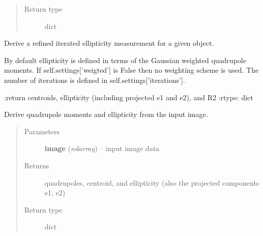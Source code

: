 \documentclass[a4paper,12pt,english]{sphinxmanual}
\begin{document}
\begin{fulllineitems}
\begin{fulllineitems}
\begin{quote}
\begin{description}
\item[{Return type}] \leavevmode
dict

\end{description}\end{quote}

\end{fulllineitems}


\begin{fulllineitems}
\label{analysis:analysis.shape.shapeMeasurement.measureRefinedEllipticity}
Derive a refined iterated ellipticity measurement for a given object.

By default ellipticity is defined in terms of the Gaussian weighted quadrupole moments.
If self.settings{[}'weigted'{]} is False then no weighting scheme is used.
The number of iterations is defined in self.settings{[}'iterations'{]}.

:return centroids, ellipticity (including projected e1 and e2), and R2
:rtype: dict

\end{fulllineitems}


\begin{fulllineitems}
\label{analysis:analysis.shape.shapeMeasurement.quadrupoles}
Derive quadrupole moments and ellipticity from the input image.
\begin{quote}\begin{description}
\item[{Parameters}] \leavevmode
\textbf{image} (\emph{ndarray}) -- input image data

\item[{Returns}] \leavevmode
quadrupoles, centroid, and ellipticity (also the projected components e1, e2)

\item[{Return type}] \leavevmode
dict

\end{description}\end{quote}

\end{fulllineitems}



\end{fulllineitems}
\end{document}
